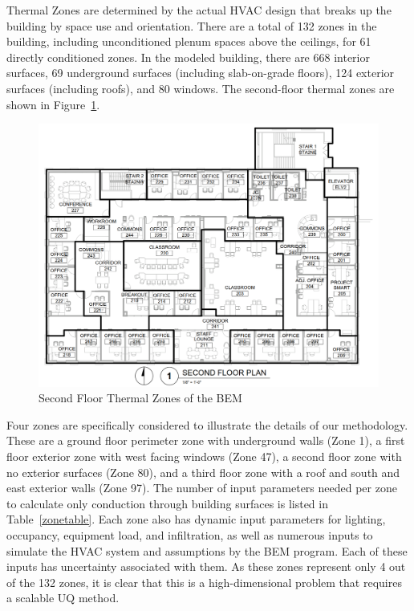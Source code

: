 Thermal Zones are determined by the actual HVAC design that breaks up the building by space use and orientation.  There are a total of 132 zones in the building, including unconditioned plenum spaces above the ceilings, for 61 directly conditioned zones.  In the modeled building, there are 668 interior surfaces, 69 underground surfaces (including slab-on-grade floors), 124 exterior surfaces (including roofs), and 80 windows.  The second-floor thermal zones are shown in Figure~\ref{floor_plan}.

\begin{figure}[H]
\centering
\includegraphics[scale=0.4]{jbs_figures/floor_plan}
\caption{Second Floor Thermal Zones of the BEM}
\label{floor_plan}
\end{figure}

Four zones are specifically considered to illustrate the details of our methodology. These are a ground floor perimeter zone with underground walls (Zone 1), a first floor exterior zone with west facing windows (Zone 47), a second floor zone with no exterior surfaces (Zone 80), and a third floor zone with a roof and south and east exterior walls (Zone 97).  The number of input parameters needed per zone to calculate only conduction through building surfaces is listed in Table~\ref{zonetable}.  Each zone also has dynamic input parameters for lighting, occupancy, equipment load, and infiltration, as well as numerous inputs to simulate the HVAC system and assumptions by the BEM program.  Each of these inputs has uncertainty associated with them. As these zones represent only 4 out of the 132 zones, it is clear that this is a high-dimensional problem that requires a scalable UQ method. 

